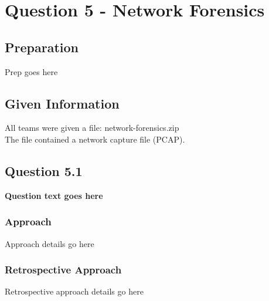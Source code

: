 \chapter{Question 5 - Network Forensics}

\section{Preparation}
Prep goes here

\section{Given Information}
All teams were given a file: network-forensics.zip\\
The file contained a network capture file (PCAP).

\section{Question 5.1}
\textbf{Question text goes here}
\subsection{Approach}
Approach details go here
\subsection{Retrospective Approach}
Retrospective approach details go here
